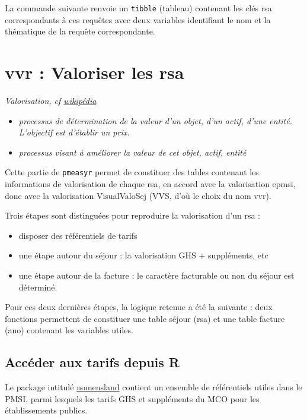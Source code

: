 \documentclass[
]{book}
\providecommand{\tightlist}{%
  \setlength{\itemsep}{0pt}\setlength{\parskip}{0pt}}
\begin{document}
La commande suivante renvoie un \texttt{tibble} (tableau) contenant les clés rsa correspondants à ces requêtes avec deux variables identifiant le nom et la thématique de la requête correspondante.

\hypertarget{vvr-valoriser-les-rsa}{%
\chapter{vvr : Valoriser les rsa}\label{vvr-valoriser-les-rsa}}

\emph{Valorisation, cf \href{https://fr.wikipedia.org/wiki/Valorisation}{wikipédia}}

\begin{itemize}
\tightlist
\item
  \emph{processus de détermination de la valeur d'un objet, d'un actif, d'une entité. L'objectif est d'établir un prix.}
\item
  \emph{processus visant à améliorer la valeur de cet objet, actif, entité}
\end{itemize}

Cette partie de \texttt{pmeasyr} permet de constituer des tables contenant les informations de valorisation de chaque rsa, en accord avec la valorisation epmsi, donc avec la valorisation VisualValoSej (VVS, d'où le choix du nom vvr).

Trois étapes sont distinguées pour reproduire la valorisation d'un rsa :

\begin{itemize}
\tightlist
\item
  disposer des référentiels de tarifs
\item
  une étape autour du séjour : la valorisation GHS + suppléments, etc
\item
  une étape autour de la facture : le caractère facturable ou non du séjour est déterminé.
\end{itemize}

Pour ces deux dernières étapes, la logique retenue a été la suivante : deux fonctions permettent de constituer une table séjour (rsa) et une table facture (ano) contenant les variables utiles.

\hypertarget{accuxe9der-aux-tarifs-depuis-r}{%
\section{Accéder aux tarifs depuis R}\label{accuxe9der-aux-tarifs-depuis-r}}

Le package intitulé \href{https://guillaumepressiat.github.io/nomensland/index.html}{nomensland} contient un ensemble de référentiels utiles dans le PMSI, parmi lesquels les tarifs GHS et suppléments du MCO pour les établissements publics.
\end{document}
